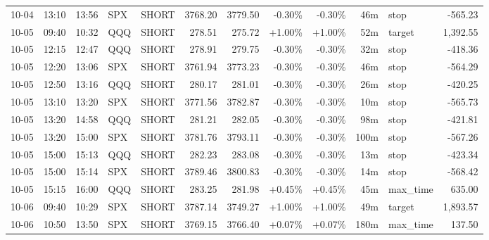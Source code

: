 \documentclass[11pt,a4paper,twoside]{article}
\begin{document}
\begin{center}
\begin{longtable}{>{\color{txtmain}}l l l l l r r r r r >{\color{txtmain}}l r}
10-04 & 13:10 & 13:56 & SPX & SHORT & 3768.20 & 3779.50 & \textcolor{lossred}{-0.30\%} & \textcolor{lossred}{-0.30\%} & 46m & stop & \textcolor{lossred}{-565.23} \\
10-05 & 09:40 & 10:32 & QQQ & SHORT & 278.51 & 275.72 & \textcolor{wingreen}{+1.00\%} & \textcolor{wingreen}{+1.00\%} & 52m & target & \textcolor{wingreen}{1,392.55} \\
10-05 & 12:15 & 12:47 & QQQ & SHORT & 278.91 & 279.75 & \textcolor{lossred}{-0.30\%} & \textcolor{lossred}{-0.30\%} & 32m & stop & \textcolor{lossred}{-418.36} \\
10-05 & 12:20 & 13:06 & SPX & SHORT & 3761.94 & 3773.23 & \textcolor{lossred}{-0.30\%} & \textcolor{lossred}{-0.30\%} & 46m & stop & \textcolor{lossred}{-564.29} \\
10-05 & 12:50 & 13:16 & QQQ & SHORT & 280.17 & 281.01 & \textcolor{lossred}{-0.30\%} & \textcolor{lossred}{-0.30\%} & 26m & stop & \textcolor{lossred}{-420.25} \\
10-05 & 13:10 & 13:20 & SPX & SHORT & 3771.56 & 3782.87 & \textcolor{lossred}{-0.30\%} & \textcolor{lossred}{-0.30\%} & 10m & stop & \textcolor{lossred}{-565.73} \\
10-05 & 13:20 & 14:58 & QQQ & SHORT & 281.21 & 282.05 & \textcolor{lossred}{-0.30\%} & \textcolor{lossred}{-0.30\%} & 98m & stop & \textcolor{lossred}{-421.81} \\
10-05 & 13:20 & 15:00 & SPX & SHORT & 3781.76 & 3793.11 & \textcolor{lossred}{-0.30\%} & \textcolor{lossred}{-0.30\%} & 100m & stop & \textcolor{lossred}{-567.26} \\
10-05 & 15:00 & 15:13 & QQQ & SHORT & 282.23 & 283.08 & \textcolor{lossred}{-0.30\%} & \textcolor{lossred}{-0.30\%} & 13m & stop & \textcolor{lossred}{-423.34} \\
10-05 & 15:00 & 15:14 & SPX & SHORT & 3789.46 & 3800.83 & \textcolor{lossred}{-0.30\%} & \textcolor{lossred}{-0.30\%} & 14m & stop & \textcolor{lossred}{-568.42} \\
10-05 & 15:15 & 16:00 & QQQ & SHORT & 283.25 & 281.98 & \textcolor{wingreen}{+0.45\%} & \textcolor{wingreen}{+0.45\%} & 45m & max\_time & \textcolor{wingreen}{635.00} \\
10-06 & 09:40 & 10:29 & SPX & SHORT & 3787.14 & 3749.27 & \textcolor{wingreen}{+1.00\%} & \textcolor{wingreen}{+1.00\%} & 49m & target & \textcolor{wingreen}{1,893.57} \\
10-06 & 10:50 & 13:50 & SPX & SHORT & 3769.15 & 3766.40 & \textcolor{wingreen}{+0.07\%} & \textcolor{wingreen}{+0.07\%} & 180m & max\_time & \textcolor{wingreen}{137.50} \\

\end{longtable}
\end{center}
\end{document}
